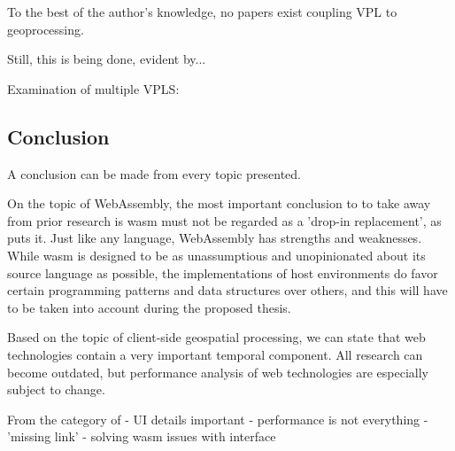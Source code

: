 




To the best of the author's knowledge, no papers exist coupling VPL to geoprocessing.

Still, this is being done, evident by...


Examination of multiple VPLS:






\subsection{Conclusion}

A conclusion can be made from every topic presented. 

On the topic of WebAssembly, the most important conclusion to to take away from prior research is \ac{wasm} must not be regarded as a 'drop-in replacement', as \cite{melch_performance_2019} puts it. Just like any language, WebAssembly has strengths and weaknesses. While \ac{wasm} is designed to be as unassumptious and unopinionated about its source language as possible, the implementations of host environments do favor certain programming patterns and data structures over others, and this will have to be taken into account during the proposed thesis.

Based on the topic of client-side geospatial processing, we can state that web technologies contain a very important temporal component. All research can become outdated, but performance analysis of web technologies are especially subject to change.  

From the category of 
- UI details important
- performance is not everything
- 'missing link'
- solving wasm issues with interface


